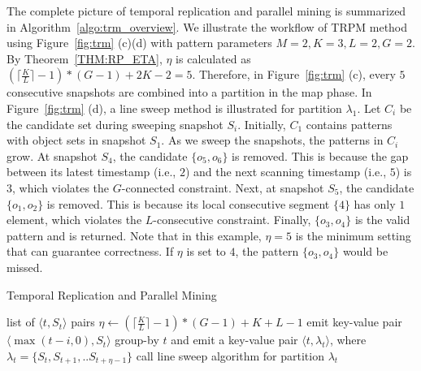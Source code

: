 The complete picture of temporal replication and parallel mining is summarized in Algorithm~\ref{algo:trm_overview}. We illustrate the workflow of TRPM method using Figure~\ref{fig:trm} (c)(d) with pattern
parameters $M=2, K=3, L = 2, G=2$. By Theorem~\ref{THM:RP_ETA}, $\eta$ is calculated
as $(\lceil \frac{K}{L} \rceil-1) *(G-1)+2K - 2 = 5$. Therefore, 
in Figure~\ref{fig:trm} (c), every $5$ consecutive snapshots are combined 
into a partition in the map phase. In Figure~\ref{fig:trm} (d), a line sweep
method is illustrated for partition $\lambda_1$. Let $C_i$ be the candidate set
during sweeping snapshot $S_i$.
Initially, $C_1$ contains patterns with object sets in snapshot $S_1$.
As we sweep the snapshots, the patterns in $C_i$ grow. At snapshot $S_4$, the candidate
$\{o_5,o_6\}$ is removed. This is because the gap between its latest timestamp (i.e., $2$)
and the next scanning timestamp (i.e., $5$) is $3$, which violates the $G$-connected constraint.
Next, at snapshot $S_5$, the candidate $\{o_1,o_2\}$ is removed. This is
because its local consecutive segment $\{4\}$ has only $1$ element,
which violates the $L$-consecutive constraint.
Finally, $\{o_3,o_4\}$ is the valid pattern and is returned. Note that in this example, $\eta=5$ is the minimum setting that can guarantee correctness. If $\eta$ is set to $4$, the pattern $\{o_3,o_4\}$ would be missed. 

\begin{algorithm}[h]
\caption{Temporal Replication and Parallel Mining}
\label{algo:trm_overview}
\begin{algorithmic}[1]
\Require list of $\langle t, S_t \rangle$ pairs
\State $\eta \gets (\lceil \frac{K}{L} \rceil -1)*(G-1)+K+L-1$
\label{code:trm-map-start}
		\State emit key-value pair $\langle \max(t-i,0), S_t \rangle$ 
	\EndFor  
\EndFor
\label{code:trm-map-end}
\label{code:trm-par-start}
\State group-by $t$ and emit a key-value pair $\langle t, \lambda_t\rangle$, where $\lambda_t = \{S_t, S_{t+1}, .. S_{t+\eta-1}\} $
\EndFor
\label{code:trm-par-end}
\label{code:trm-red-start}
\State call line sweep algorithm for partition $\lambda_t$
\label{code:trm-red-end}
\EndFor
\end{algorithmic}
\end{algorithm}
